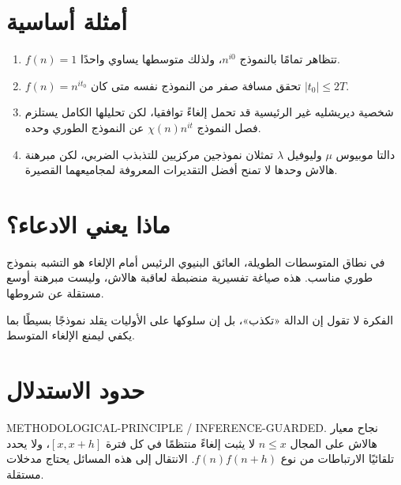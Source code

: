 \section{أمثلة أساسية}

\begin{remark}
\label{rem:ch24-examples}
\begin{enumerate}
  \item \(f(n)=1\) تتظاهر تمامًا بالنموذج \(n^{i0}\)، ولذلك متوسطها يساوي واحدًا.
  \item \(f(n)=n^{it_0}\) تحقق مسافة صفر من النموذج نفسه متى كان \(|t_0|\le2T\).
  \item شخصية ديريشليه غير الرئيسية قد تحمل إلغاءً توافقيا، لكن تحليلها الكامل يستلزم فصل النموذج \(\chi(n)n^{it}\) عن النموذج الطوري وحده.
  \item دالتا موبيوس \(\mu\) وليوفيل \(\lambda\) تمثلان نموذجين مركزيين للتذبذب الضربي، لكن مبرهنة هالاش وحدها لا تمنح أفضل التقديرات المعروفة لمجاميعهما القصيرة.
\end{enumerate}
\end{remark}

\section{ماذا يعني الادعاء؟}

\begin{remark}
\label{rem:ch24-pretentious-obstruction}
في نطاق المتوسطات الطويلة، العائق البنيوي الرئيس أمام الإلغاء هو التشبه بنموذج طوري مناسب. هذه صياغة تفسيرية منضبطة لعاقبة هالاش، وليست مبرهنة أوسع مستقلة عن شروطها.
\end{remark}

الفكرة لا تقول إن الدالة «تكذب»، بل إن سلوكها على الأوليات يقلد نموذجًا بسيطًا بما يكفي ليمنع الإلغاء المتوسط.

\section{حدود الاستدلال}

\begin{remark}
\label{rem:ch24-long-vs-short}
\noindent\textenglish{METHODOLOGICAL-PRINCIPLE / INFERENCE-GUARDED}.
نجاح معيار هالاش على المجال \(n\le x\) لا يثبت إلغاءً منتظمًا في كل فترة \([x,x+h]\)، ولا يحدد تلقائيًا الارتباطات من نوع \(f(n)f(n+h)\). الانتقال إلى هذه المسائل يحتاج مدخلات مستقلة.
\end{remark}


